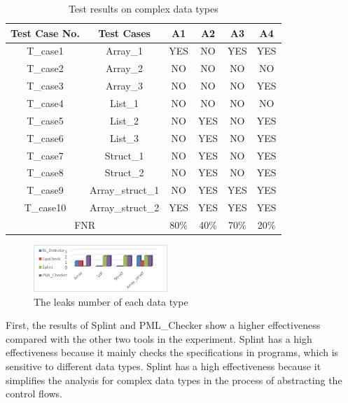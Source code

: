 \begin{table}[!h]
\center
\caption{Test results on complex data types}\label{tab:3}
\begin{tabular}{|c|c|c|c|c|c|}
\hline
\textbf{Test Case No.} & \textbf{Test Cases} & \textbf{A1} & \textbf{A2} & \textbf{A3} & \textbf{A4}\\
\hline
T\_case1	& Array\_1 &	YES & NO & YES & YES\\
\hline
T\_case2 & Array\_2 & NO & NO & NO & NO \\
\hline
T\_case3	& Array\_3 & NO &	NO & NO & YES\\
\hline
T\_case4	& List\_1	& NO &	NO & NO & NO\\
\hline
T\_case5	& List\_2 & NO & YES & NO & YES\\
\hline
T\_case6	& List\_3 &	NO	& YES & NO & YES\\
\hline
T\_case7	& Struct\_1 & NO & YES & NO & YES\\
\hline
T\_case8	& Struct\_2 & NO & YES & NO & YES\\
\hline
T\_case9	& Array\_struct\_1 & NO & YES & YES & YES\\
\hline
T\_case10 & Array\_struct\_2 & YES & YES & YES & YES\\
\hline
\multicolumn{2}{|c|}{FNR} & 80\% & 40\% & 70\% & 20\%\\
\hline
\end{tabular}
\end{table}

\begin{figure}[!h]
\center
\includegraphics[width=0.45\textwidth]{figure/fig8-fig12/fig9}
\caption{The leaks number of each data type}
\label{fig:9}
\end{figure}


First, the results of Splint and PML\_Checker show a higher effectiveness compared with the other two tools in the experiment. Splint has a high effectiveness because it mainly checks the specifications in programs, which is sensitive to different data types. Splint has a high effectiveness because it simplifies the analysis for complex data types in the process of abstracting the control flows. 

